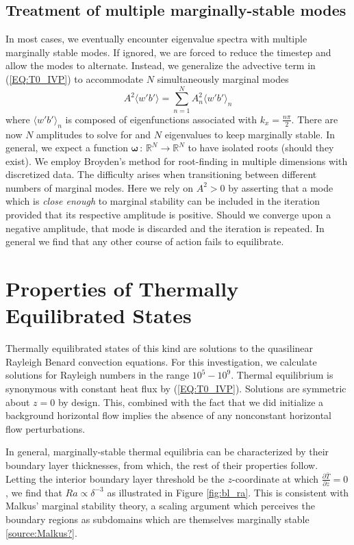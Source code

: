 \documentclass[reprint,amsmath,amssymb,aps]{revtex4-1}
\begin{document}
\subsection{Treatment of multiple marginally-stable modes} \label{sec:multiple_modes}
In most cases, we eventually encounter eigenvalue spectra with multiple marginally stable modes. If ignored, we are forced to reduce the timestep and allow the modes to alternate. Instead, we generalize the advective term in (\ref{EQ:T0_IVP}) to accommodate $N$ simultaneously marginal modes
\begin{equation}
    A^2 \langle w' b' \rangle = \sum_{n = 1}^{N} A^2_{n} \langle w' b' \rangle_{n}
\end{equation}
where  $\langle w' b' \rangle_{n}$ is composed of eigenfunctions associated with $k_x = \frac{n\pi}{2}$. There are now $N$ amplitudes to solve for and $N$ eigenvalues to keep marginally stable. In general, we expect a function $\mathbf{\omega} \, : \, \mathbb{R}^N \to  \mathbb{R}^N$ to have isolated roots (should they exist). We employ Broyden's method for root-finding in multiple dimensions with discretized data. The difficulty arises when transitioning between different numbers of marginal modes. Here we rely on $A^2 > 0$ by asserting that a mode which is \textit{close enough} to marginal stability can be included in the iteration provided that its respective amplitude is positive. Should we converge upon a negative amplitude, that mode is discarded and the iteration is repeated. In general we find that any other course of action fails to equilibrate.
\newline
\section{Properties of Thermally Equilibrated States}\label{sec:properties}
Thermally equilibrated states of this kind are solutions to the quasilinear Rayleigh Benard convection equations. For this investigation, we calculate solutions for Rayleigh numbers in the range $10^5 - 10^9$. Thermal equilibrium is synonymous with constant heat flux by (\ref{EQ:T0_IVP}). Solutions are symmetric about $z = 0$ by design. This, combined with the fact that we did initialize a background horizontal flow implies the absence of any nonconstant horizontal flow perturbations. 
\par In general, marginally-stable thermal equilibria can be characterized by their boundary layer thicknesses, from which, the rest of their properties follow. Letting the interior boundary layer threshold be the $z$-coordinate at which $\frac{\partial \bar{T}}{\partial z} = 0$, we find that $Ra \propto  \delta^{-3}$ as illustrated in Figure \ref{fig:bl_ra}. This is consistent with Malkus' marginal stability theory, a scaling argument which perceives the boundary regions as subdomains which are themselves marginally stable \ref{source:Malkus?}.
\end{document}
